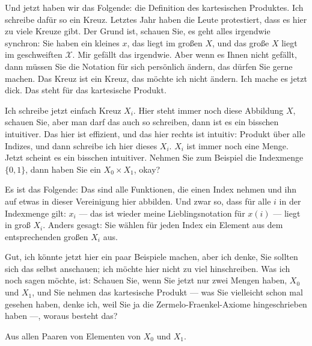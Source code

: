 \begin{spoken-clean}[00:15:23 - 00:17:30]
Und jetzt haben wir das Folgende: die Definition des kartesischen Produktes. Ich schreibe dafür so ein Kreuz. Letztes Jahr haben die Leute protestiert, dass es hier zu viele Kreuze gibt. Der Grund ist, schauen Sie, es geht alles irgendwie synchron: Sie haben ein kleines $x$, das liegt im großen $X$, und das große $X$ liegt im geschweiften $\mathcal{X}$. Mir gefällt das irgendwie. Aber wenn es Ihnen nicht gefällt, dann müssen Sie die Notation für sich persönlich ändern, das dürfen Sie gerne machen. Das Kreuz ist ein Kreuz, das möchte ich nicht ändern. Ich mache es jetzt dick. Das steht für das kartesische Produkt.

Ich schreibe jetzt einfach Kreuz $X_i$. Hier steht immer noch diese Abbildung $X$, schauen Sie, aber man darf das auch so schreiben, dann ist es ein bisschen intuitiver. Das hier ist effizient, und das hier rechts ist intuitiv: Produkt über alle Indizes, und dann schreibe ich hier dieses $X_i$. $X_i$ ist immer noch eine Menge. Jetzt scheint es ein bisschen intuitiver. Nehmen Sie zum Beispiel die Indexmenge $\{0, 1\}$, dann haben Sie ein $X_0 \times X_1$, okay?

Es ist das Folgende: Das sind alle Funktionen, die einen Index nehmen und ihn auf etwas in dieser Vereinigung hier abbilden. Und zwar so, dass für alle $i$ in der Indexmenge gilt: $x_i$ --- das ist wieder meine Lieblingsnotation für $x(i)$ --- liegt in groß $X_i$. Anders gesagt: Sie wählen für jeden Index ein Element aus dem entsprechenden großen $X_i$ aus.

Gut, ich könnte jetzt hier ein paar Beispiele machen, aber ich denke, Sie sollten sich das selbst anschauen; ich möchte hier nicht zu viel hinschreiben. Was ich noch sagen möchte, ist: Schauen Sie, wenn Sie jetzt nur zwei Mengen haben, $X_0$ und $X_1$, und Sie nehmen das kartesische Produkt --- was Sie vielleicht schon mal gesehen haben, denke ich, weil Sie ja die Zermelo-Fraenkel-Axiome hingeschrieben haben ---, woraus besteht das?
\end{spoken-clean}

\begin{student-interaction}[Studentenantwort]
Aus allen Paaren von Elementen von $X_0$ und $X_1$.
\end{student-interaction}

